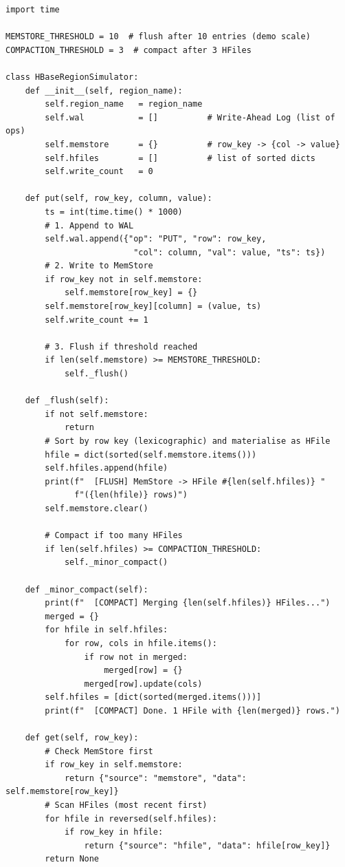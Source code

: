 \begin{lstlisting}[style=pyspark, caption={PE4.3: HBase write path and compaction simulator}]
import time

MEMSTORE_THRESHOLD = 10  # flush after 10 entries (demo scale)
COMPACTION_THRESHOLD = 3  # compact after 3 HFiles

class HBaseRegionSimulator:
    def __init__(self, region_name):
        self.region_name   = region_name
        self.wal           = []          # Write-Ahead Log (list of ops)
        self.memstore      = {}          # row_key -> {col -> value}
        self.hfiles        = []          # list of sorted dicts
        self.write_count   = 0

    def put(self, row_key, column, value):
        ts = int(time.time() * 1000)
        # 1. Append to WAL
        self.wal.append({"op": "PUT", "row": row_key,
                          "col": column, "val": value, "ts": ts})
        # 2. Write to MemStore
        if row_key not in self.memstore:
            self.memstore[row_key] = {}
        self.memstore[row_key][column] = (value, ts)
        self.write_count += 1

        # 3. Flush if threshold reached
        if len(self.memstore) >= MEMSTORE_THRESHOLD:
            self._flush()

    def _flush(self):
        if not self.memstore:
            return
        # Sort by row key (lexicographic) and materialise as HFile
        hfile = dict(sorted(self.memstore.items()))
        self.hfiles.append(hfile)
        print(f"  [FLUSH] MemStore -> HFile #{len(self.hfiles)} "
              f"({len(hfile)} rows)")
        self.memstore.clear()

        # Compact if too many HFiles
        if len(self.hfiles) >= COMPACTION_THRESHOLD:
            self._minor_compact()

    def _minor_compact(self):
        print(f"  [COMPACT] Merging {len(self.hfiles)} HFiles...")
        merged = {}
        for hfile in self.hfiles:
            for row, cols in hfile.items():
                if row not in merged:
                    merged[row] = {}
                merged[row].update(cols)
        self.hfiles = [dict(sorted(merged.items()))]
        print(f"  [COMPACT] Done. 1 HFile with {len(merged)} rows.")

    def get(self, row_key):
        # Check MemStore first
        if row_key in self.memstore:
            return {"source": "memstore", "data": self.memstore[row_key]}
        # Scan HFiles (most recent first)
        for hfile in reversed(self.hfiles):
            if row_key in hfile:
                return {"source": "hfile", "data": hfile[row_key]}
        return None


\end{lstlisting}
